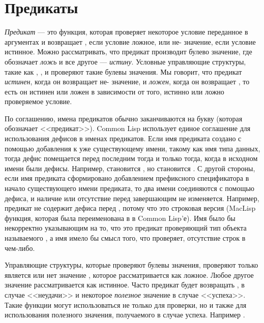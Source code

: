 \else

\chapter{Предикаты}
\label{PREDS}

\emph{Предикат} --- это функция, которая проверяет некоторое условие
переданное в аргументах и возвращает {\false}, если условие ложное, или
не-{\false} значение, если условие истинное. Можно рассматривать, что предикат
производит булево значение, где \cd{\false} обозначает \emph{ложь} и все
другое --- \emph{истину}. Условные управляющие структуры, такие как ,
,  и  проверяют такие булевы значения.
Мы говорит, что предикат \emph{истинен}, когда он возвращает не-{\false}
значение, и \emph{ложен}, когда он возвращает {\false}, то есть он истинен
или ложен в зависимости от того, истинно или ложно проверяемое условие.

По соглашению, имена предикатов обычно заканчиваются на букву  (которая
обозначает <<предикат>>).
Common Lisp использует единое соглашение для использования дефисов в именах
предикатов. Если имя предиката создано с помощью добавления  к уже
существующему имени, такому как имя типа данных, тогда дефис помещается перед
последним  тогда и только тогда, когда в исходном имени были
дефисы. Например,  становится , но 
становится .
С другой стороны, если имя предиката сформировано добавлением префиксного
спецификатора в начало существующего имени предиката, то два имени соединяются с
помощью дефиса, и наличие или отсутствие перед завершающим  не
изменяется. Например, предикат  не содержит дефиса перед
, потому что это строковая версия  (MacLisp функция, которая
была переименована в \cdf{<} в Common Lisp'е). Имя  было бы
некорректно указывающим на то, что это предикат проверяющий тип объекта
называемого , а имя  имело бы смысл того, что
проверяет, отсутствие строк в чем-либо. 

Управляющие структуры, которые проверяют булевы значения, проверяют только
является или нет значение {\false}, которое рассматривается как ложное. Любое
другое значение рассматривается как истинное. Часто предикат будет возвращать
{\false}, в случае <<неудачи>> и некоторое \emph{полезное} значение в случае
<<успеха>>. Такие функции могут использоваться не только для проверки, но и
также для использования полезного значения, получаемого в случае
успеха. Например .

